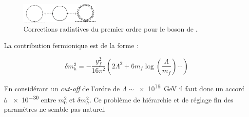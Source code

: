 \begin{itemize}[label=$\bullet$]
\begin{figure}[ht!]
\centering
\includegraphics[width=0.35\textwidth]{SM/corrections.jpg}
\captionsetup{type=figure}\caption{Corrections radiatives du premier ordre pour le boson de .}
\label{corrections}
\end{figure}

La contribution fermionique est de la forme :

\begin{equation}
\label{eq1}
\delta m_{h}^{2}=-\frac{y_{f}^{2}}{16\pi^{2}}\left(2\Lambda^{2}+6m_{f}\log\left(\frac{\Lambda}{m_{f}}\right)\cdots\right)
\end{equation}

En considérant un \textit{cut-off} de l'ordre de $\Lambda \sim$\SI{e16}{\giga\eV} il faut donc un accord à \num{e-30} entre $m_{0}^{2}$ et $\delta m_{h}^{2}$. Ce problème de hiérarchie et de réglage fin des paramètres ne semble pas naturel.


\end{itemize}
